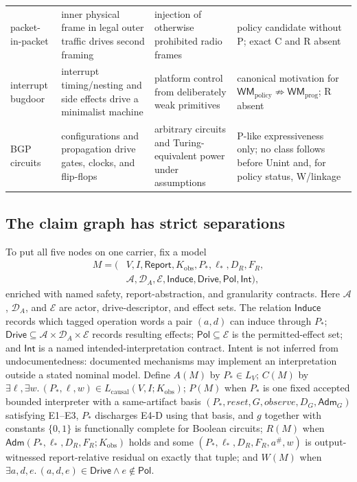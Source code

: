 \documentclass[conference]{IEEEtran}
\begin{document}
\begin{table}[!t]
\begin{tabularx}{\textwidth}{@{}p{}p{}p{}Y@{}}
packet-in-packet \cite{ref51} & inner physical frame in legal outer traffic drives second framing & injection of otherwise prohibited radio frames & policy candidate without P; exact C and R absent \\
interrupt bugdoor \cite{ref52} & interrupt timing/nesting and side effects drive a minimalist machine & platform control from deliberately weak primitives & canonical motivation for $\mathsf{WM}_{\mathrm{policy}}\not\Rightarrow\mathsf{WM}_{\mathrm{prog}}$; R absent \\
BGP circuits \cite{ref53} & configurations and propagation drive gates, clocks, and flip-flops & arbitrary circuits and Turing-equivalent power under assumptions & P-like expressiveness only; no class follows before Unint and, for policy status, W/linkage \\
\bottomrule
\end{tabularx}
\end{table}

\subsection{The claim graph has strict separations}

To put all five nodes on one carrier, fix a model
\begin{equation}
\begin{aligned}
M=(&V,I,\mathsf{Report},K_{\mathrm{obs}},P_*,\ell_*,D_R,F_R,\\
&\mathcal A,\mathcal D_A,\mathcal E,\mathsf{Induce},\mathsf{Drive},\mathsf{Pol},\mathsf{Int}),
\end{aligned}
\end{equation}
enriched with named safety, report-abstraction, and granularity contracts. Here $\mathcal A$, $\mathcal D_A$, and $\mathcal E$ are actor, drive-descriptor, and effect sets. The relation $\mathsf{Induce}$ records which tagged operation words a pair $(a,d)$ can induce through $P_*$; $\mathsf{Drive}\subseteq\mathcal A\times\mathcal D_A\times\mathcal E$ records resulting effects; $\mathsf{Pol}\subseteq\mathcal E$ is the permitted-effect set; and $\mathsf{Int}$ is a named intended-interpretation contract. Intent is not inferred from undocumentedness: documented mechanisms may implement an interpretation outside a stated nominal model. Define $A(M)$ by $P_*\in L_V$;
$C(M)$ by $\exists\ell,\exists w.\,(P_*,\ell,w)\in L_{\mathrm{causal}}(V,I;K_{\mathrm{obs}})$;
$P(M)$ when $P_*$ is one fixed accepted bounded interpreter with a same-artifact basis $(P_*,\mathit{reset},G,\mathit{observe},D_G,\mathsf{Adm}_G)$ satisfying E1--E3, $P_*$ discharges E4-D using that basis, and $g$ together with constants $\{0,1\}$ is functionally complete for Boolean circuits;
$R(M)$ when $\mathsf{Adm}(P_*,\ell_*,D_R,F_R;K_{\mathrm{obs}})$ holds and some $(P_*,\ell_*,D_R,F_R,a^\#,w)$ is output-witnessed report-relative residual on exactly that tuple; and
$W(M)$ when $\exists a,d,e.\,(a,d,e)\in\mathsf{Drive}\land e\notin\mathsf{Pol}$.
\end{document}
